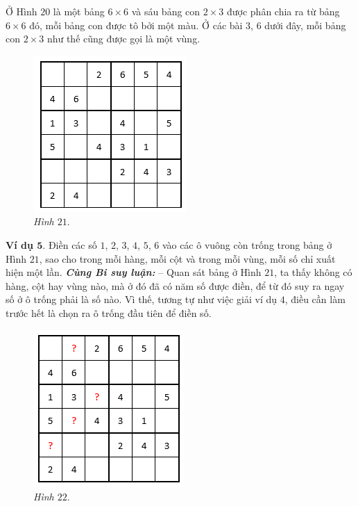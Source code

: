 		Ở Hình $20$ là một bảng $6\times6$ và sáu bảng con $2\times3$ được phân chia ra từ bảng $6\times6$ đó, mỗi bảng con được tô bởi một màu. Ở các bài $3$, $6$ dưới đây, mỗi bảng con $2\times3$ như thế cũng được gọi là một vùng.
		\vskip 0.1cm
		\begin{figure}
			\centering
			\vspace*{-25pt}
			\captionsetup{labelformat= empty, justification=centering}
			\includegraphics[scale=0.5]{pic10}
			\vspace*{-5pt}
			\caption{\small\textit{Hình $21.$}}
			\vspace*{-20pt}
		\end{figure}
	\textbf{Ví dụ $\pmb{5.}$} Điền các số $1$, $2$, $3$, $4$, $5$, $6$ vào các ô vuông còn trống trong bảng ở Hình $21$, sao cho trong mỗi hàng, mỗi cột và trong mỗi vùng, mỗi số chỉ xuất hiện một lần.
	\vskip 0.1cm
	\textbf{\textit{Cùng Bi suy luận:}}
	\vskip 0.05cm
	-- Quan sát bảng ở Hình $21$, ta thấy không có hàng, cột hay vùng nào, mà ở đó đã có năm số được điền, để từ đó suy ra ngay số ở ô trống phải là số nào. Vì thế, tương tự như việc giải ví dụ $4$, điều cần làm trước hết là chọn ra ô trống đầu tiên để điền số.
	\vskip 0.05cm
	\begin{figure}
		\centering
		\vspace*{-15pt}
		\captionsetup{labelformat= empty, justification=centering}
		\includegraphics[scale=0.5]{pic11}
		\vspace*{-5pt}
		\caption{\small\textit{Hình $22.$}}
		\vspace*{-15pt}
	\end{figure}
